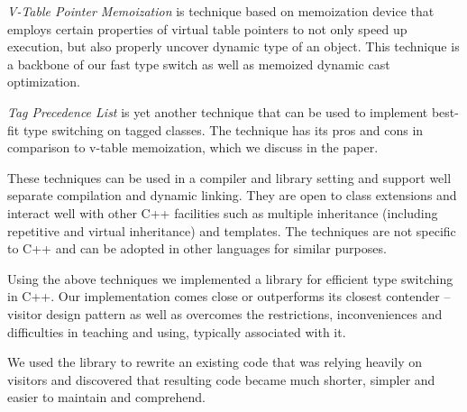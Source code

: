 \documentclass[preprint]{sigplanconf}
\begin{document}
\emph{V-Table Pointer Memoization} is technique based on memoization device that 
employs certain properties of virtual table pointers to not only speed up 
execution, but also properly uncover dynamic type of an object. This technique 
is a backbone of our fast type switch as well as memoized dynamic cast 
optimization.

\emph{Tag Precedence List} is yet another technique that can be used to 
implement best-fit type switching on tagged classes. The technique has its pros 
and cons in comparison to v-table memoization, which we discuss in the paper.

These techniques can be used in a compiler and library setting and support well 
separate compilation and dynamic linking. They are open to class extensions and 
interact well with other C++ facilities such as multiple inheritance (including 
repetitive and virtual inheritance) and templates. The techniques are not 
specific to C++ and can be adopted in other languages for similar purposes.

Using the above techniques we implemented a library for efficient type switching 
in C++. Our implementation comes close or outperforms its closest contender -- 
visitor design pattern as well as overcomes the restrictions, inconveniences and 
difficulties in teaching and using, typically associated with it.

We used the library to rewrite an existing code that was relying heavily on 
visitors and discovered that resulting code became much shorter, simpler and easier 
to maintain and comprehend.



\end{document}
